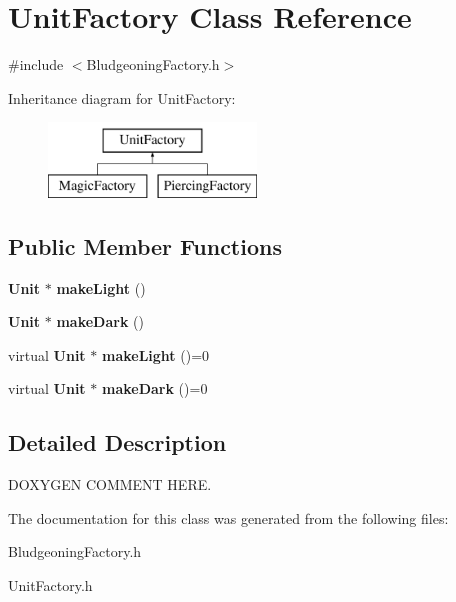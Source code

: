\section{Unit\+Factory Class Reference}
\label{class_unit_factory}


{\ttfamily \#include $<$Bludgeoning\+Factory.\+h$>$}

Inheritance diagram for Unit\+Factory\+:\begin{figure}[H]
\begin{center}
\leavevmode
\includegraphics[height=2.000000cm]{class_unit_factory}
\end{center}
\end{figure}
\subsection*{Public Member Functions}
\begin{DoxyCompactItemize}
\item 
{\bf Unit} $\ast$ {\bfseries make\+Light} ()\label{class_unit_factory_a321efab812a837b52f303fc737048c30}

\item 
{\bf Unit} $\ast$ {\bfseries make\+Dark} ()\label{class_unit_factory_aa2f1d6eebffefbafa173b79fe38beb49}

\item 
virtual {\bf Unit} $\ast$ {\bfseries make\+Light} ()=0\label{class_unit_factory_a8857f9a5156d856c01dd95b58ff4133d}

\item 
virtual {\bf Unit} $\ast$ {\bfseries make\+Dark} ()=0\label{class_unit_factory_a14e80f213953ac2c4d58ea5d287762c4}

\end{DoxyCompactItemize}


\subsection{Detailed Description}
D\+O\+X\+Y\+G\+E\+N C\+O\+M\+M\+E\+N\+T H\+E\+R\+E. 

The documentation for this class was generated from the following files\+:\begin{DoxyCompactItemize}
\item 
Bludgeoning\+Factory.\+h\item 
Unit\+Factory.\+h\end{DoxyCompactItemize}
